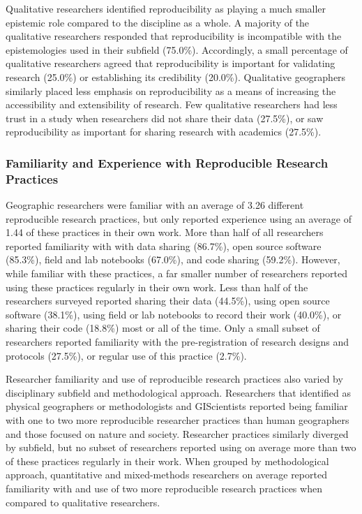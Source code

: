 \documentclass[]{interact}
\theoremstyle{plain}%
\theoremstyle{definition}
\theoremstyle{remark}
\begin{document}
Qualitative researchers identified reproducibility as playing a much smaller epistemic role compared to the discipline as a whole. 
A majority of the qualitative researchers responded that reproducibility is incompatible with the epistemologies used in their subfield (75.0\%).
Accordingly, a small percentage of qualitative researchers agreed that reproducibility is important for validating research (25.0\%) or establishing its credibility (20.0\%).
Qualitative geographers similarly placed less emphasis on reproducibility as a means of increasing the accessibility and extensibility of research.
Few qualitative researchers had less trust in a study when researchers did not share their data (27.5\%), or saw reproducibility as important for sharing research with academics (27.5\%).

\subsubsection*{Familiarity and Experience with Reproducible Research Practices}
Geographic researchers were familiar with an average of 3.26 different reproducible research practices, but only reported experience using an average of 1.44 of these practices in their own work.
More than half of all researchers reported familiarity with with data sharing (86.7\%), open source software (85.3\%), field and lab notebooks (67.0\%), and code sharing (59.2\%).
However, while familiar with these practices, a far smaller number of researchers reported using these practices regularly in their own work. 
Less than half of the researchers surveyed reported sharing their data (44.5\%), using open source software (38.1\%), using field or lab notebooks to record their work (40.0\%), or sharing their code (18.8\%) most or all of the time. 
Only a small subset of researchers reported familiarity with the pre-registration of research designs and protocols (27.5\%), or regular use of this practice (2.7\%).

Researcher familiarity and use of reproducible research practices also varied by disciplinary subfield and methodological approach. 
Researchers that identified as physical geographers or methodologists and GIScientists reported being familiar with one to two more reproducible researcher practices than human geographers and those focused on nature and society.
Researcher practices similarly diverged by subfield, but no subset of researchers reported using on average more than two of these practices regularly in their work.  
When grouped by methodological approach, quantitative and mixed-methods researchers on average reported familiarity with and use of two more reproducible research practices when compared to qualitative researchers.
\end{document}
